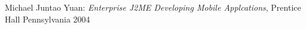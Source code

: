 \begin{thebibliography}{99}
 Michael Juntao Yuan: \emph{Enterprise J2ME Developing Mobile
Applcations}, Prentice Hall Pennsylvania 2004
\end{thebibliography}